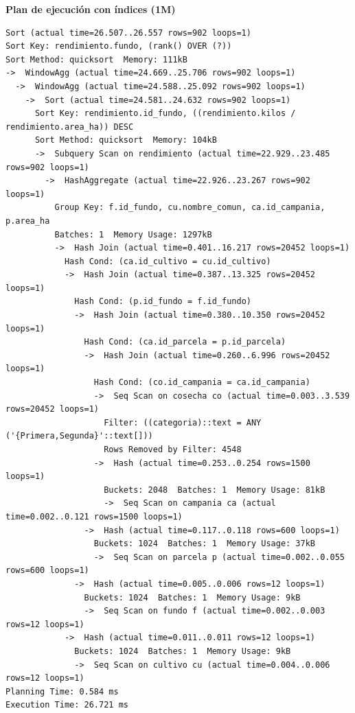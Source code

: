 \documentclass[11pt,letterpaper]{article}
\begin{document}
\textbf{Plan de ejecución con índices (1M)}
\begin{lstlisting}[style=plano]
Sort (actual time=26.507..26.557 rows=902 loops=1)
Sort Key: rendimiento.fundo, (rank() OVER (?))
Sort Method: quicksort  Memory: 111kB
->  WindowAgg (actual time=24.669..25.706 rows=902 loops=1)
  ->  WindowAgg (actual time=24.588..25.092 rows=902 loops=1)
    ->  Sort (actual time=24.581..24.632 rows=902 loops=1)
      Sort Key: rendimiento.id_fundo, ((rendimiento.kilos / rendimiento.area_ha)) DESC
      Sort Method: quicksort  Memory: 104kB
      ->  Subquery Scan on rendimiento (actual time=22.929..23.485 rows=902 loops=1)
        ->  HashAggregate (actual time=22.926..23.267 rows=902 loops=1)
          Group Key: f.id_fundo, cu.nombre_comun, ca.id_campania, p.area_ha
          Batches: 1  Memory Usage: 1297kB
          ->  Hash Join (actual time=0.401..16.217 rows=20452 loops=1)
            Hash Cond: (ca.id_cultivo = cu.id_cultivo)
            ->  Hash Join (actual time=0.387..13.325 rows=20452 loops=1)
              Hash Cond: (p.id_fundo = f.id_fundo)
              ->  Hash Join (actual time=0.380..10.350 rows=20452 loops=1)
                Hash Cond: (ca.id_parcela = p.id_parcela)
                ->  Hash Join (actual time=0.260..6.996 rows=20452 loops=1)
                  Hash Cond: (co.id_campania = ca.id_campania)
                  ->  Seq Scan on cosecha co (actual time=0.003..3.539 rows=20452 loops=1)
                    Filter: ((categoria)::text = ANY ('{Primera,Segunda}'::text[]))
                    Rows Removed by Filter: 4548
                  ->  Hash (actual time=0.253..0.254 rows=1500 loops=1)
                    Buckets: 2048  Batches: 1  Memory Usage: 81kB
                    ->  Seq Scan on campania ca (actual time=0.002..0.121 rows=1500 loops=1)
                ->  Hash (actual time=0.117..0.118 rows=600 loops=1)
                  Buckets: 1024  Batches: 1  Memory Usage: 37kB
                  ->  Seq Scan on parcela p (actual time=0.002..0.055 rows=600 loops=1)
              ->  Hash (actual time=0.005..0.006 rows=12 loops=1)
                Buckets: 1024  Batches: 1  Memory Usage: 9kB
                ->  Seq Scan on fundo f (actual time=0.002..0.003 rows=12 loops=1)
            ->  Hash (actual time=0.011..0.011 rows=12 loops=1)
              Buckets: 1024  Batches: 1  Memory Usage: 9kB
              ->  Seq Scan on cultivo cu (actual time=0.004..0.006 rows=12 loops=1)
Planning Time: 0.584 ms
Execution Time: 26.721 ms
\end{lstlisting}
\end{document}
